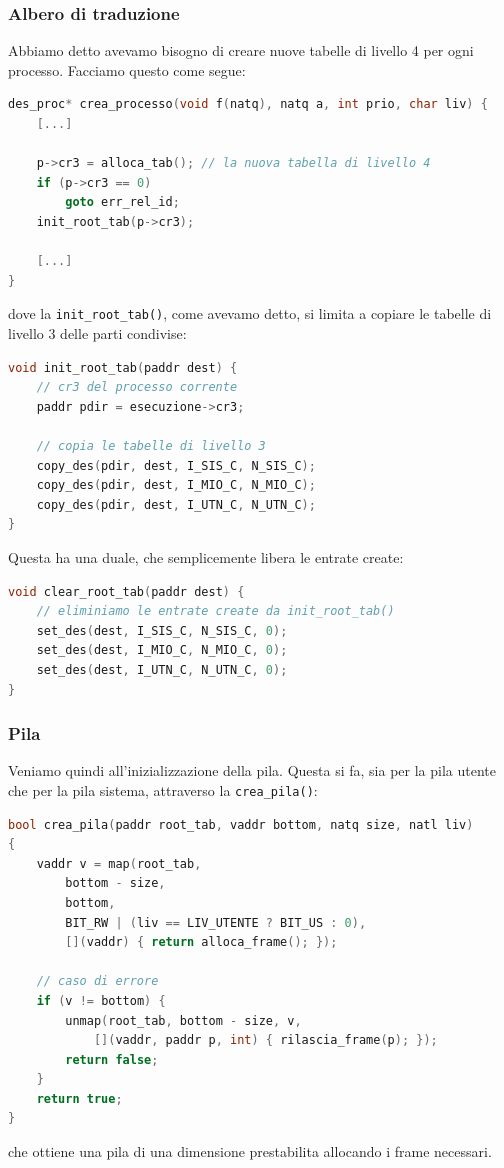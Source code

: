 \documentclass[a4paper,11pt]{article}
\begin{document}
\subsubsection{Albero di traduzione}
Abbiamo detto avevamo bisogno di creare nuove tabelle di livello 4 per ogni processo.
Facciamo questo come segue:
\begin{lstlisting}[language=C++, style=codestyle]	
des_proc* crea_processo(void f(natq), natq a, int prio, char liv) {
	[...]

	p->cr3 = alloca_tab(); // la nuova tabella di livello 4
	if (p->cr3 == 0)
		goto err_rel_id;
	init_root_tab(p->cr3);
	
	[...]
}
\end{lstlisting}
dove la \lstinline|init_root_tab()|, come avevamo detto, si limita a copiare le tabelle di livello 3 delle parti condivise:
\begin{lstlisting}[language=C++, style=codestyle]	
void init_root_tab(paddr dest) {
	// cr3 del processo corrente
	paddr pdir = esecuzione->cr3;

	// copia le tabelle di livello 3
	copy_des(pdir, dest, I_SIS_C, N_SIS_C);
	copy_des(pdir, dest, I_MIO_C, N_MIO_C);
	copy_des(pdir, dest, I_UTN_C, N_UTN_C);
}
\end{lstlisting}

Questa ha una duale, che semplicemente libera le entrate create:
\begin{lstlisting}[language=C++, style=codestyle]	
void clear_root_tab(paddr dest) {
	// eliminiamo le entrate create da init_root_tab()
	set_des(dest, I_SIS_C, N_SIS_C, 0);
	set_des(dest, I_MIO_C, N_MIO_C, 0);
	set_des(dest, I_UTN_C, N_UTN_C, 0);
}
\end{lstlisting}

\subsubsection{Pila}
Veniamo quindi all'inizializzazione della pila.
Questa si fa, sia per la pila utente che per la pila sistema, attraverso la \lstinline|crea_pila()|:
\begin{lstlisting}[language=C++, style=codestyle]	
bool crea_pila(paddr root_tab, vaddr bottom, natq size, natl liv)
{
	vaddr v = map(root_tab,
		bottom - size,
		bottom,
		BIT_RW | (liv == LIV_UTENTE ? BIT_US : 0),
		[](vaddr) { return alloca_frame(); });

	// caso di errore
	if (v != bottom) {
		unmap(root_tab, bottom - size, v,
			[](vaddr, paddr p, int) { rilascia_frame(p); });
		return false;
	}
	return true;
}
\end{lstlisting}
che ottiene una pila di una dimensione prestabilita allocando i frame necessari.
\end{document}
